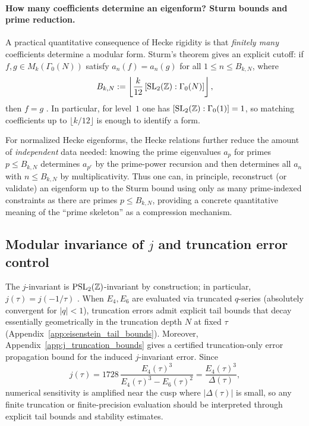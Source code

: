 \paragraph{How many coefficients determine an eigenform? Sturm bounds and prime reduction.}
A practical quantitative consequence of Hecke rigidity is that \emph{finitely many} coefficients determine a modular form. Sturm's theorem gives an explicit cutoff: if $f,g\in M_k(\Gamma_0(N))$ satisfy $a_n(f)=a_n(g)$ for all $1\le n\le B_{k,N}$, where
\begin{equation}
B_{k,N}:=\left\lfloor \frac{k}{12}\,[\mathrm{SL}_2(\mathbb{Z}):\Gamma_0(N)]\right\rfloor,
\end{equation}
then $f=g$ \cite{Sturm1987,DiamondShurman2005}. In particular, for level~$1$ one has $[\mathrm{SL}_2(\mathbb{Z}):\Gamma_0(1)]=1$, so matching coefficients up to $\lfloor k/12\rfloor$ is enough to identify a form.
\par
For normalized Hecke eigenforms, the Hecke relations further reduce the amount of \emph{independent} data needed: knowing the prime eigenvalues $a_p$ for primes $p\le B_{k,N}$ determines $a_{p^r}$ by the prime-power recursion and then determines all $a_n$ with $n\le B_{k,N}$ by multiplicativity. Thus one can, in principle, reconstruct (or validate) an eigenform up to the Sturm bound using only as many prime-indexed constraints as there are primes $p\le B_{k,N}$, providing a concrete quantitative meaning of the ``prime skeleton'' as a compression mechanism.

\subsection{Modular invariance of \texorpdfstring{$j$}{j} and truncation error control}
\label{sec:quant_j_invariant}

The $j$-invariant is $\mathrm{PSL}_2(\mathbb{Z})$-invariant by construction; in particular, $j(\tau)=j(-1/\tau)$ \cite{Serre1973,Apostol1990}. When $E_4,E_6$ are evaluated via truncated $q$-series (absolutely convergent for $|q|<1$), truncation errors admit explicit tail bounds that decay essentially geometrically in the truncation depth $N$ at fixed $\tau$ (Appendix~\ref{app:eisenstein_tail_bounds}). Moreover, Appendix~\ref{app:j_truncation_bounds} gives a certified truncation-only error propagation bound for the induced $j$-invariant error. Since
\begin{equation}
j(\tau)=1728\,\frac{E_4(\tau)^3}{E_4(\tau)^3-E_6(\tau)^2}=\frac{E_4(\tau)^3}{\Delta(\tau)},
\end{equation}
numerical sensitivity is amplified near the cusp where $|\Delta(\tau)|$ is small, so any finite truncation or finite-precision evaluation should be interpreted through explicit tail bounds and stability estimates.

